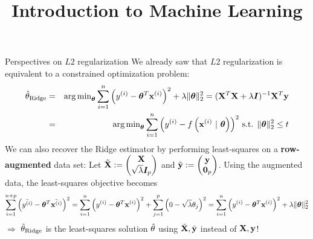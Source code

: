 \documentclass[11pt,compress,t,notes=noshow, xcolor=table]{beamer}
\title{Introduction to Machine Learning}
\date{}
\begin{document}



\begin{vbframe}{Perspectives on $L2$ regularization}
We already saw that $L2$ regularization is equivalent to a constrained optimization problem:
\begin{eqnarray*}  
  \hat{\theta}_{\text{Ridge}} &=& \operatorname{arg\,min}_{\bm{\theta}} \sum\limits_{i=1}^n \left(y^{(i)} - \bm{\theta}^T \mathbf{x}^{(i)} \right)^2 + \lambda \|\bm{\theta}\|_2^2 = ({\mathbf{X}}^T \mathbf{X}  + \lambda \boldsymbol{I})^{-1} \mathbf{X}^T\mathbf{y}\\
  &=& \operatorname{arg\,min}_{\bm{\theta}} \sum\limits_{i=1}^n \left(y^{(i)} - f\left(\mathbf{x}^{(i)} ~|~ \bm{\theta}\right)\right)^2 \,
  \text{s.t. } \|\bm{\theta}\|_2^2  \leq t
  \end{eqnarray*}
We can also recover the Ridge estimator by performing least-squares on a \textbf{row-augmented} data set: Let \scriptsize{$\tilde{\mathbf{X}}:= \begin{pmatrix} \mathbf{X} \\ \sqrt{\lambda} \boldsymbol{I}_{p} \end{pmatrix}$ and $\tilde{\mathbf{y}} := \begin{pmatrix}
    \mathbf{y} \\ \bm{0}_{p}
\end{pmatrix}$.} \normalsize{Using the augmented data, the least-squares objective becomes}
\small{
$$%
\sum_{i=1}^{n+p} \left(\tilde{\yi} - \thetab^T \tilde{\xi} \right)^2 = %
\sum_{i=1}^{n} \left(\yi - \thetab^T \xi \right)^2 + \sum_{j=1}^{p} \left(0 - \sqrt{\lambda} \theta_j \right)^2 %
=\sumin \left(\yi - \thetab^T \xi \right)^2 + \lambda \|\thetab\|_2^2
$$
}
\normalsize{$\Longrightarrow$ $\hat{\theta}_{\text{Ridge}}$ is the least-squares solution $\hat{\theta}$ using $\tilde{\mathbf{X}},\tilde{\mathbf{y}}$ instead of $\mathbf{X}, \mathbf{y}$!}
\end{vbframe}
\end{document}
